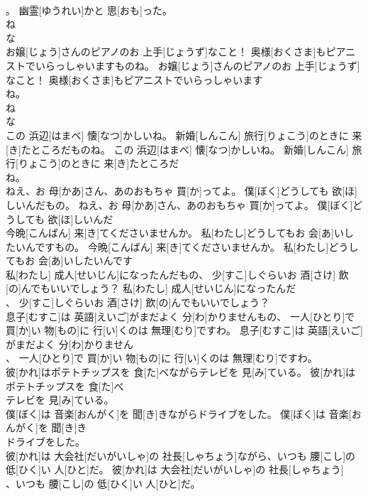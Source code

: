 \documentclass[8pt]{extreport}
\begin{document}
\begin{CJK}{UTF8}{min}
\\	。 幽霊[ゆうれい]かと 思[おも]った。	
\\	ね 
\\	な 
\\	お嬢[じょう]さんのピアノのお 上手[じょうず]なこと！ 奥様[おくさま]もピアニストでいらっしゃいますものね。	お嬢[じょう]さんのピアノのお 上手[じょうず]なこと！ 奥様[おくさま]もピアニストでいらっしゃいます
\\	ね。	
\\	ね 
\\	な 
\\	この 浜辺[はまべ] 懐[なつ]かしいね。 新婚[しんこん] 旅行[りょこう]のときに 来[き]たところだものね。	この 浜辺[はまべ] 懐[なつ]かしいね。 新婚[しんこん] 旅行[りょこう]のときに 来[き]たところだ
\\	ね。	
\\	ねえ、お 母[かあ]さん、あのおもちゃ 買[か]ってよ。 僕[ぼく]どうしても 欲[ほ]しいんだもの。	ねえ、お 母[かあ]さん、あのおもちゃ 買[か]ってよ。 僕[ぼく]どうしても 欲[ほ]しいんだ
\\	今晩[こんばん] 来[き]てくださいませんか。 私[わたし]どうしてもお 会[あ]いしたいんですもの。	今晩[こんばん] 来[き]てくださいませんか。 私[わたし]どうしてもお 会[あ]いしたいんです
\\	私[わたし] 成人[せいじん]になったんだもの、 少[すこ]しぐらいお 酒[さけ] 飲[の]んでもいいでしょう？	私[わたし] 成人[せいじん]になったんだ
\\	、 少[すこ]しぐらいお 酒[さけ] 飲[の]んでもいいでしょう？	
\\	息子[むすこ]は 英語[えいご]がまだよく 分[わ]かりませんもの、 一人[ひとり]で 買[か]い 物[もの]に 行[い]くのは 無理[むり]ですわ。	息子[むすこ]は 英語[えいご]がまだよく 分[わ]かりません
\\	、 一人[ひとり]で 買[か]い 物[もの]に 行[い]くのは 無理[むり]ですわ。	
\\	彼[かれ]はポテトチップスを 食[た]べながらテレビを 見[み]ている。	彼[かれ]はポテトチップスを 食[た]べ
\\	テレビを 見[み]ている。	
\\	僕[ぼく]は 音楽[おんがく]を 聞[き]きながらドライブをした。	僕[ぼく]は 音楽[おんがく]を 聞[き]き
\\	ドライブをした。	
\\	彼[かれ]は 大会社[だいがいしゃ]の 社長[しゃちょう]ながら、いつも 腰[こし]の 低[ひく]い 人[ひと]だ。	彼[かれ]は 大会社[だいがいしゃ]の 社長[しゃちょう]
\\	、いつも 腰[こし]の 低[ひく]い 人[ひと]だ。	

\end{CJK}
\end{document}

